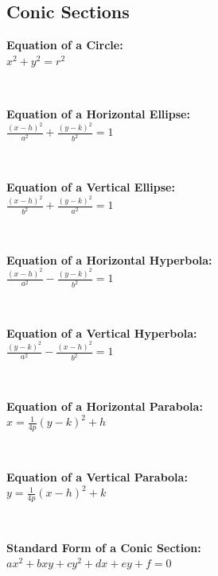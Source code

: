\subsection*{Conic Sections}
\begin{minipage}{\textwidth}
    \textbf{Equation of a Circle:}
    \\ \( x^2 + y^2 = r^2 \)
\end{minipage}
\\ \begin{minipage}{\textwidth}
    \textbf{Equation of a Horizontal Ellipse:}
    \\ \( \displaystyle\frac{ ( x - h )^2 }{ a^2 } + \displaystyle\frac{ ( y - k )^2 }{ b^2 } = 1 \)
\end{minipage}
\\ \begin{minipage}{\textwidth}
    \textbf{Equation of a Vertical Ellipse:}
    \\ \( \displaystyle\frac{ ( x - h )^2 }{ b^2 } + \displaystyle\frac{ ( y - k )^2 }{ a^2 } = 1 \)
\end{minipage}
\\ \begin{minipage}{\textwidth}
    \textbf{Equation of a Horizontal Hyperbola:}
    \\ \( \displaystyle\frac{ ( x - h )^2 }{ a^2 } - \displaystyle\frac{ ( y - k )^2 }{ b^2 } = 1 \)
\end{minipage}
\\ \begin{minipage}{\textwidth}
    \textbf{Equation of a Vertical Hyperbola:}
    \\ \( \displaystyle\frac{ ( y - k )^2 }{ a^2 } - \displaystyle\frac{ ( x - h )^2 }{ b^2 } = 1 \)
\end{minipage}
\\ \begin{minipage}{\textwidth}
    \textbf{Equation of a Horizontal Parabola:}
    \\ \( x = \displaystyle\frac{ 1 }{ 4p } (y - k)^2 +h \)
\end{minipage}
\\ \begin{minipage}{\textwidth}
    \textbf{Equation of a Vertical Parabola:}
    \\ \( y = \displaystyle\frac{ 1 }{ 4p } (x - h)^2 +k \)
\end{minipage}
\\ \begin{minipage}{\textwidth}
    \textbf{Standard Form of a Conic Section:}
    \\ \( ax^2 + bxy + cy^2 + dx + ey + f = 0 \)
\end{minipage}

